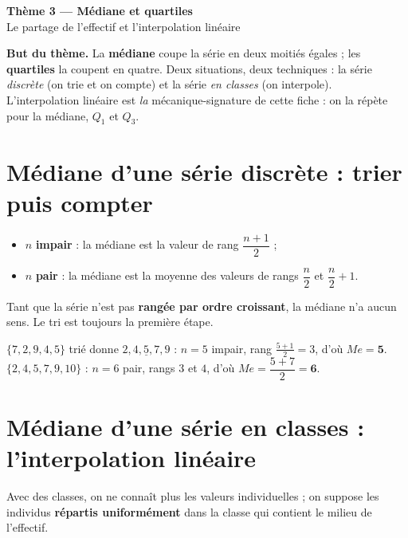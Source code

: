 \documentclass[11pt,a4paper]{article}
\newcommand{\bandeau}[2]{%
\begin{tcolorbox}[boxbase,colback=primary,colframe=primarydark,halign=center,
   before skip=2pt,after skip=12pt]
{\LARGE\bfseries\color{white} #1}\\[3pt]{\normalsize\color{white} #2}
\end{tcolorbox}}
\newcommand{\med}{M\!e}
\begin{document}
\bandeau{Thème 3 — Médiane et quartiles}{Le partage de l'effectif et l'interpolation linéaire}

\noindent\textbf{But du thème.} La \textbf{médiane} coupe la série en deux moitiés égales ; les
\textbf{quartiles} la coupent en quatre. Deux situations, deux techniques : la série \emph{discrète}
(on trie et on compte) et la série \emph{en classes} (on interpole). L'interpolation linéaire est
\emph{la} mécanique-signature de cette fiche : on la répète pour la médiane, $Q_1$ et $Q_3$.

\section{Médiane d'une série discrète : trier puis compter}

\begin{formule}
\begin{itemize}
  \item $n$ \textbf{impair} : la médiane est la valeur de rang $\dfrac{n+1}{2}$ ;
  \item $n$ \textbf{pair} : la médiane est la moyenne des valeurs de rangs $\dfrac{n}{2}$ et
        $\dfrac{n}{2}+1$.
\end{itemize}
\end{formule}

\begin{attention}
Tant que la série n'est pas \textbf{rangée par ordre croissant}, la médiane n'a aucun sens.
Le tri est toujours la première étape.
\end{attention}

\begin{exemple}
$\{7,2,9,4,5\}$ trié donne $2,4,\underline{5},7,9$ : $n=5$ impair, rang $\tfrac{5+1}{2}=3$, d'où
$\med=\mathbf{5}$.\\
$\{2,4,5,7,9,10\}$ : $n=6$ pair, rangs $3$ et $4$, d'où $\med=\dfrac{5+7}{2}=\mathbf{6}$.
\end{exemple}

\section{Médiane d'une série en classes : l'interpolation linéaire}

Avec des classes, on ne connaît plus les valeurs individuelles ; on suppose les individus
\textbf{répartis uniformément} dans la classe qui contient le milieu de l'effectif.
\end{document}
